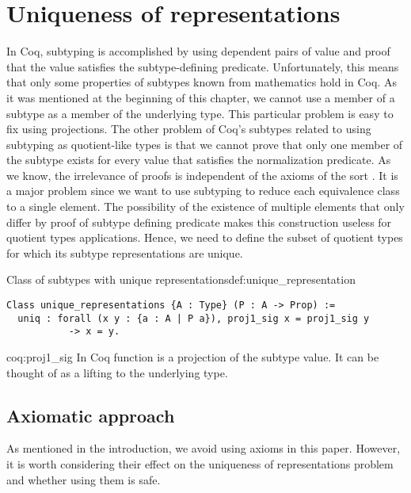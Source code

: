 \section{Uniqueness of representations}
In Coq, subtyping is accomplished by using dependent pairs of value and proof that the value satisfies the subtype-defining predicate. Unfortunately, this means that only some properties of subtypes known from mathematics hold in Coq. As it was mentioned at the beginning of this chapter, we cannot use a member of a subtype as a member of the underlying type. This particular problem is easy to fix using projections. The other problem of Coq's subtypes related to using subtyping as quotient-like types is that we cannot prove that only one member of the subtype exists for every value that satisfies the normalization predicate. As we know, the irrelevance of proofs is independent of the axioms of the  sort \cite{CoqBook2}. It is a major problem since we want to use subtyping to reduce each equivalence class to a single element. The possibility of the existence of multiple elements that only differ by proof of subtype defining predicate makes this construction useless for quotient types applications. Hence, we need to define the subset of quotient types for which its subtype representations are unique.
\begin{defi}{Class of subtypes with unique representations}{def:unique_representation}
\begin{verbatim}
Class unique_representations {A : Type} (P : A -> Prop) := 
  uniq : forall (x y : {a : A | P a}), proj1_sig x = proj1_sig y 
           -> x = y.
\end{verbatim}
\end{defi}
\begin{coq}{}{coq:proj1_sig}
In Coq function  is a projection of the subtype value. It can be thought of as a lifting to the underlying type.
\end{coq}
\subsection{Axiomatic approach}
As mentioned in the introduction, we avoid using axioms in this paper. However, it is worth considering their effect on the uniqueness of representations problem and whether using them is safe.
